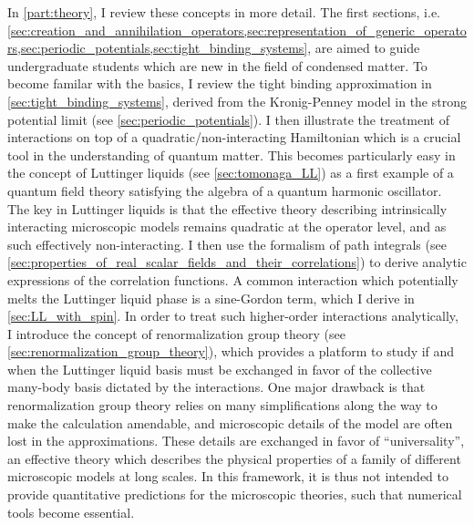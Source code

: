 In \cref{part:theory}, I review these concepts in more detail.
The first sections, i.e. \cref{sec:creation_and_annihilation_operators,sec:representation_of_generic_operators,sec:periodic_potentials,sec:tight_binding_systems}, are aimed to guide undergraduate students which are new in the field of condensed matter.
To become familar with the basics, I review the tight binding approximation in \cref{sec:tight_binding_systems}, derived from the Kronig-Penney model in the strong potential limit (see \cref{sec:periodic_potentials}).
I then illustrate the treatment of interactions on top of a quadratic/non-interacting Hamiltonian which is a crucial tool in the understanding of quantum matter.
This becomes particularly easy in the concept of Luttinger liquids (see \cref{sec:tomonaga_LL}) as a first example of a quantum field theory satisfying the algebra of a quantum harmonic oscillator.
The key in Luttinger liquids is that the effective theory describing intrinsically interacting microscopic models remains quadratic at the operator level, and as such effectively non-interacting.
I then use the formalism of path integrals (see \cref{sec:properties_of_real_scalar_fields_and_their_correlations}) to derive analytic expressions of the correlation functions.
A common interaction which potentially melts the Luttinger liquid phase is a sine-Gordon term, which I derive in \cref{sec:LL_with_spin}.
In order to treat such higher-order interactions analytically, I introduce the concept of renormalization group theory (see \cref{sec:renormalization_group_theory}), which provides a platform to study if and when the Luttinger liquid basis must be exchanged in favor of the collective many-body basis dictated by the interactions.
One major drawback is that renormalization group theory relies on many simplifications along the way to make the calculation amendable, and microscopic details of the model are often lost in the approximations.
These details are exchanged in favor of ``universality'', an effective theory which describes the physical properties of a family of different microscopic models at long scales.
In this framework, it is thus not intended to provide quantitative predictions for the microscopic theories, such that numerical tools become essential.

